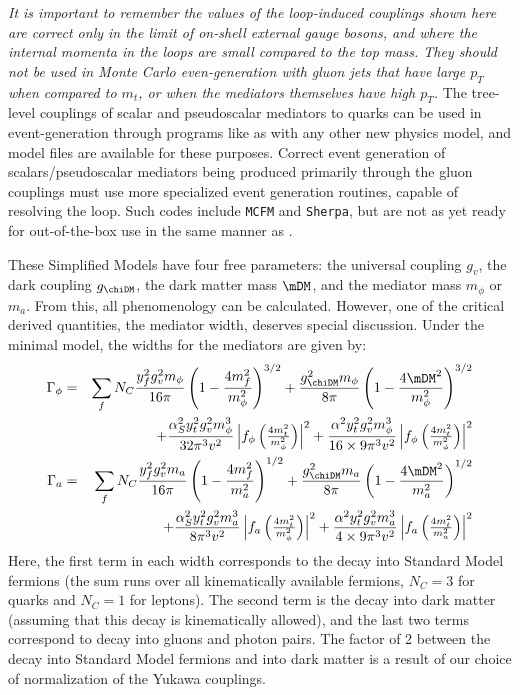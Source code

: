 {\it It is important to remember the values of the loop-induced couplings shown here are correct only in the limit of on-shell external gauge bosons, and where the internal momenta in the loops are small compared to the top mass. They should not be used in Monte Carlo even-generation with gluon jets that have large $p_T$ when compared to $m_t$, or when the mediators themselves have high $p_T$.} The tree-level couplings of scalar and pseudoscalar mediators to quarks can be used in event-generation through programs like \madgraph as with any other new physics model, and model files are available for these purposes. Correct event generation of scalars/pseudoscalar mediators being produced primarily through the gluon couplings must use more specialized event generation routines, capable of resolving the loop. Such codes include {\tt MCFM} and {\tt Sherpa}, but are not as yet ready for out-of-the-box use in the same manner as \madgraph.

These Simplified Models have four free parameters: the universal coupling $g_v$, the dark coupling $g_\chiDM$, the dark matter mass $\mDM$, and the mediator mass $m_{\phi}$ or $m_a$. From this, all phenomenology can be calculated. However, one of the critical derived quantities, the mediator width, deserves special discussion. Under the minimal model, the widths for the mediators are given by:
\begin{eqnarray}
\Gamma_\phi & = & \sum_f N_C \frac{y_f^2 g_v^2 m_\phi}{16 \pi} \left(1-\frac{4 m_f^2}{m_\phi^2}\right)^{3/2} + \frac{g_\chiDM^2 m_\phi}{8 \pi} \left(1-\frac{4 \mDM^2}{m_\phi^2}\right)^{3/2}  \label{eq:scalarwidth} \\
& & \nonumber + \frac{\alpha_S^2 y_t^2 g_v^2 m_\phi^3}{32 \pi^3 v^2} \left| f_\phi\left(\tfrac{4m_t^2}{m_\phi^2} \right)\right|^2+ \frac{\alpha^2 y_t^2 g_v^2 m_\phi^3}{16\times 9 \pi^3 v^2} \left| f_\phi\left(\tfrac{4m_t^2}{m_\phi^2} \right)\right|^2 \label{eq:pseudoscalarwidth} \\
\Gamma_a & = & \sum_f N_C \frac{y_f^2 g_v^2 m_a}{16 \pi} \left(1-\frac{4 m_f^2}{m_a^2}\right)^{1/2} + \frac{g_\chiDM^2 m_a}{8 \pi} \left(1-\frac{4 \mDM^2}{m_a^2}\right)^{1/2}  \\
& & \nonumber + \frac{\alpha_S^2 y_t^2 g_v^2 m_a^3}{8 \pi^3 v^2} \left| f_a\left(\tfrac{4m_t^2}{m_\phi^2} \right)\right|^2+ \frac{\alpha^2 y_t^2 g_v^2 m_a^3}{4\times 9 \pi^3 v^2} \left| f_a\left(\tfrac{4m_t^2}{m_a^2} \right)\right|^2 
\end{eqnarray}
Here, the first term in each width corresponds to the decay into Standard Model fermions (the sum runs over all kinematically available fermions, $N_C = 3$ for quarks and $N_C = 1$ for leptons). The second term is the decay into dark matter (assuming that this decay is kinematically allowed), and the last two terms correspond to decay into gluons and photon pairs. The factor of 2 between the decay into Standard Model fermions and into dark matter is a result of our choice of normalization of the Yukawa couplings.

